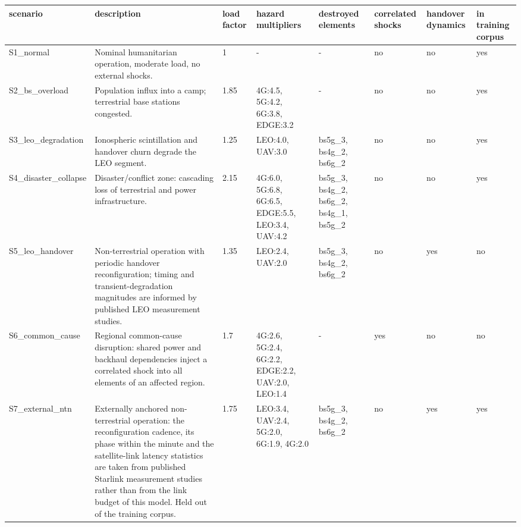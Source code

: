 \begin{tabular}{llllllll}
\toprule
scenario & description & load factor & hazard multipliers & destroyed elements & correlated shocks & handover dynamics & in training corpus \\
\midrule
S1\_normal & Nominal humanitarian operation, moderate load, no external shocks. & 1 & - & - & no & no & yes \\
S2\_bs\_overload & Population influx into a camp; terrestrial base stations congested. & 1.85 & 4G:4.5, 5G:4.2, 6G:3.8, EDGE:3.2 & - & no & no & yes \\
S3\_leo\_degradation & Ionospheric scintillation and handover churn degrade the LEO segment. & 1.25 & LEO:4.0, UAV:3.0 & bs5g\_3, bs4g\_2, bs6g\_2 & no & no & yes \\
S4\_disaster\_collapse & Disaster/conflict zone: cascading loss of terrestrial and power infrastructure. & 2.15 & 4G:6.0, 5G:6.8, 6G:6.5, EDGE:5.5, LEO:3.4, UAV:4.2 & bs5g\_3, bs4g\_2, bs6g\_2, bs4g\_1, bs5g\_2 & no & no & yes \\
S5\_leo\_handover & Non-terrestrial operation with periodic handover reconfiguration; timing and transient-degradation magnitudes are informed by published LEO measurement studies. & 1.35 & LEO:2.4, UAV:2.0 & bs5g\_3, bs4g\_2, bs6g\_2 & no & yes & no \\
S6\_common\_cause & Regional common-cause disruption: shared power and backhaul dependencies inject a correlated shock into all elements of an affected region. & 1.7 & 4G:2.6, 5G:2.4, 6G:2.2, EDGE:2.2, UAV:2.0, LEO:1.4 & - & yes & no & no \\
S7\_external\_ntn & Externally anchored non-terrestrial operation: the reconfiguration cadence, its phase within the minute and the satellite-link latency statistics are taken from published Starlink measurement studies rather than from the link budget of this model. Held out of the training corpus. & 1.75 & LEO:3.4, UAV:2.4, 5G:2.0, 6G:1.9, 4G:2.0 & bs5g\_3, bs4g\_2, bs6g\_2 & no & yes & yes \\
\bottomrule
\end{tabular}
